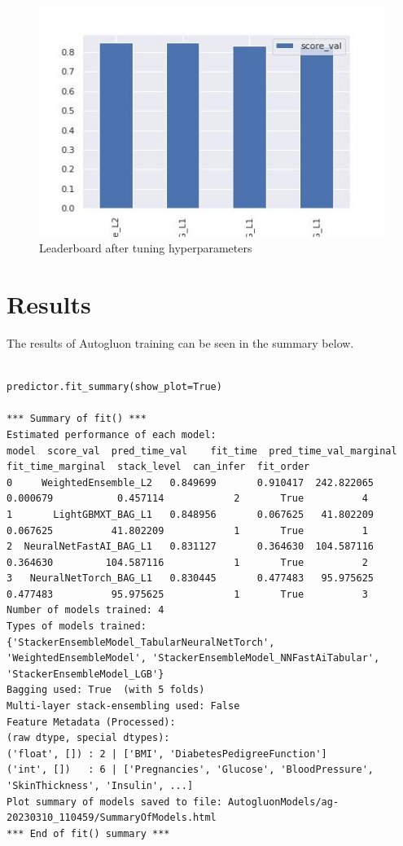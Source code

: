 \documentclass[
]{article}
\begin{document}
\begin{figure}
\centering
\includegraphics{leaderboard_hyper_tune.jpg}
\caption{Leaderboard after tuning hyperparameters}
\end{figure}

\hypertarget{results}{%
\section{Results}\label{results}}

The results of Autogluon training can be seen in the summary below.

\begin{verbatim}

predictor.fit_summary(show_plot=True)

*** Summary of fit() ***
Estimated performance of each model:
model  score_val  pred_time_val    fit_time  pred_time_val_marginal  fit_time_marginal  stack_level  can_infer  fit_order
0     WeightedEnsemble_L2   0.849699       0.910417  242.822065                0.000679           0.457114            2       True          4
1       LightGBMXT_BAG_L1   0.848956       0.067625   41.802209                0.067625          41.802209            1       True          1
2  NeuralNetFastAI_BAG_L1   0.831127       0.364630  104.587116                0.364630         104.587116            1       True          2
3   NeuralNetTorch_BAG_L1   0.830445       0.477483   95.975625                0.477483          95.975625            1       True          3
Number of models trained: 4
Types of models trained:
{'StackerEnsembleModel_TabularNeuralNetTorch', 'WeightedEnsembleModel', 'StackerEnsembleModel_NNFastAiTabular', 'StackerEnsembleModel_LGB'}
Bagging used: True  (with 5 folds)
Multi-layer stack-ensembling used: False 
Feature Metadata (Processed):
(raw dtype, special dtypes):
('float', []) : 2 | ['BMI', 'DiabetesPedigreeFunction']
('int', [])   : 6 | ['Pregnancies', 'Glucose', 'BloodPressure', 'SkinThickness', 'Insulin', ...]
Plot summary of models saved to file: AutogluonModels/ag-20230310_110459/SummaryOfModels.html
*** End of fit() summary ***
\end{verbatim}
\end{document}
